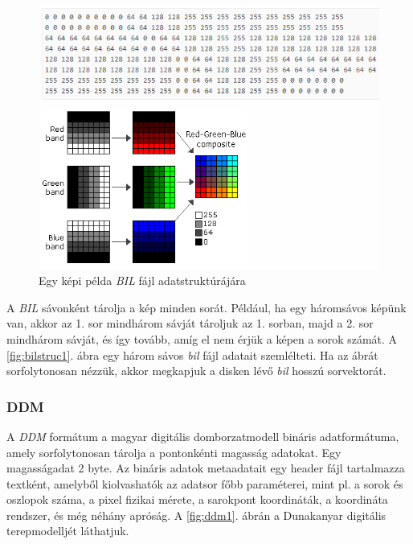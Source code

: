 \documentclass[a4paper,12pt]{article}
\begin{document}
\begin{figure}
	\centering
	\includegraphics[width=14cm]{bil_struc2.png}
	\caption{Egy képi példa \textit{BIL} fájl adatstruktúrájára}
	\label{fig:bilstruc2}
\end{figure}

A \textit{BIL} sávonként tárolja a kép minden sorát. Például, ha egy háromsávos képünk van, akkor az 1. sor mindhárom sávját tároljuk az 1. sorban, majd a 2. sor  mindhárom sávját, és így tovább, amíg el nem érjük a képen a sorok számát. A \ref{fig:bilstruc1}. ábra egy három sávos \textit{bil} fájl adatait szemlélteti. Ha az ábrát sorfolytonosan nézzük, akkor megkapjuk a disken lévő \textit{bil} hosszú sorvektorát. 



\subsubsection{DDM}

A \textit{DDM} formátum a magyar digitális domborzatmodell bináris adatformátuma, amely sorfolytonosan tárolja a pontonkénti magasság adatokat. Egy magasságadat 2 byte. Az bináris adatok metaadatait egy header fájl tartalmazza textként, amelyből kiolvashatók az adatsor főbb paraméterei, mint pl. a sorok és oszlopok száma, a pixel fizikai mérete, a sarokpont koordináták, a koordináta rendszer, és még néhány apróság. A \ref{fig:ddm1}. ábrán a Dunakanyar digitális terepmodelljét láthatjuk.
\end{document}
